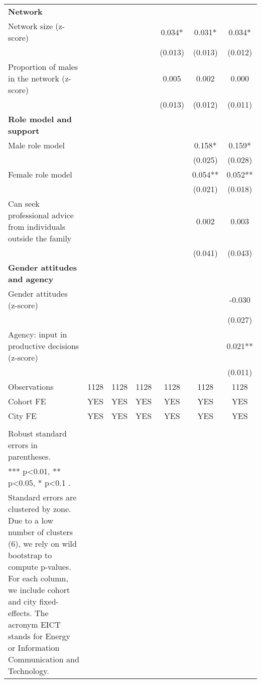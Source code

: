 \begin{landscape}
\begin{longtable}{m{9cm}cccccc}
\textbf{Network}&&&&&&\\
Network size (z-score)&&&&0.034*&0.031*&0.034*\\
&&&&(0.013)&(0.013)&(0.012)\\
Proportion of males in the network (z-score)&&&&0.005&0.002&0.000\\
&&&&(0.013)&(0.012)&(0.011)\\
\textbf{Role model and support}&&&&&&\\
Male role model&&&&&0.158*&0.159*\\
&&&&&(0.025)&(0.028)\\
Female role model&&&&&0.054**&0.052**\\
&&&&&(0.021)&(0.018)\\
Can seek professional advice from individuals outside the family&&&&&0.002&0.003\\
&&&&&(0.041)&(0.043)\\
\textbf{Gender attitudes and agency}&&&&&&\\
Gender attitudes (z-score)&&&&&&-0.030\\
&&&&&&(0.027)\\
Agency: input in productive decisions (z-score)&&&&&&0.021**\\
&&&&&&(0.011)\\
Observations&1128&1128&1128&1128&1128&1128\\
Cohort FE&YES&YES&YES&YES&YES&YES\\
City FE&YES&YES&YES&YES&YES&YES\\
\midrule
\begin{minipage}{21cm}
\small{
{\textit Notes:} \\
Robust standard errors in parentheses. \\
*** p\textless{}0.01, ** p\textless{}0.05, * p\textless{}0.1 . \\
Standard errors are clustered by zone. Due to a low number of clusters (6), we rely on wild bootstrap to compute p-values. For each column, we include cohort and city fixed-effects. The acronym EICT stands for Energy or Information Communication and Technology.
}
\end{minipage} \\* \bottomrule
\end{longtable}
\end{landscape}
